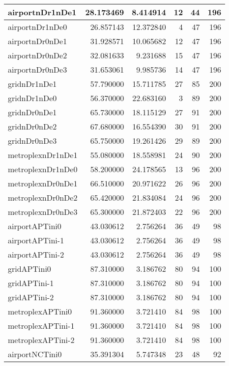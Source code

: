 \begin{longtable}{|l|r|r|r|r|r|}
\endlastfoot
airportnDr1nDe1 & 28.173469 & 8.414914 & 12 & 44 & 196 \\ \hline
airportnDr1nDe0 & 26.857143 & 12.372840 & 4 & 47 & 196 \\ \hline
airportnDr0nDe1 & 31.928571 & 10.065682 & 12 & 47 & 196 \\ \hline
airportnDr0nDe2 & 32.081633 & 9.231688 & 15 & 47 & 196 \\ \hline
airportnDr0nDe3 & 31.653061 & 9.985736 & 14 & 47 & 196 \\ \hline
gridnDr1nDe1 & 57.790000 & 15.711785 & 27 & 85 & 200 \\ \hline
gridnDr1nDe0 & 56.370000 & 22.683160 & 3 & 89 & 200 \\ \hline
gridnDr0nDe1 & 65.730000 & 18.115129 & 27 & 91 & 200 \\ \hline
gridnDr0nDe2 & 67.680000 & 16.554390 & 30 & 91 & 200 \\ \hline
gridnDr0nDe3 & 65.750000 & 19.261426 & 29 & 89 & 200 \\ \hline
metroplexnDr1nDe1 & 55.080000 & 18.558981 & 24 & 90 & 200 \\ \hline
metroplexnDr1nDe0 & 58.200000 & 24.178565 & 13 & 96 & 200 \\ \hline
metroplexnDr0nDe1 & 66.510000 & 20.971622 & 26 & 96 & 200 \\ \hline
metroplexnDr0nDe2 & 65.420000 & 21.834084 & 24 & 96 & 200 \\ \hline
metroplexnDr0nDe3 & 65.300000 & 21.872403 & 22 & 96 & 200 \\ \hline
airportAPTini0 & 43.030612 & 2.756264 & 36 & 49 & 98 \\ \hline
airportAPTini-1 & 43.030612 & 2.756264 & 36 & 49 & 98 \\ \hline
airportAPTini-2 & 43.030612 & 2.756264 & 36 & 49 & 98 \\ \hline
gridAPTini0 & 87.310000 & 3.186762 & 80 & 94 & 100 \\ \hline
gridAPTini-1 & 87.310000 & 3.186762 & 80 & 94 & 100 \\ \hline
gridAPTini-2 & 87.310000 & 3.186762 & 80 & 94 & 100 \\ \hline
metroplexAPTini0 & 91.360000 & 3.721410 & 84 & 98 & 100 \\ \hline
metroplexAPTini-1 & 91.360000 & 3.721410 & 84 & 98 & 100 \\ \hline
metroplexAPTini-2 & 91.360000 & 3.721410 & 84 & 98 & 100 \\ \hline
airportNCTini0 & 35.391304 & 5.747348 & 23 & 48 & 92 \\ \hline

\end{longtable}
